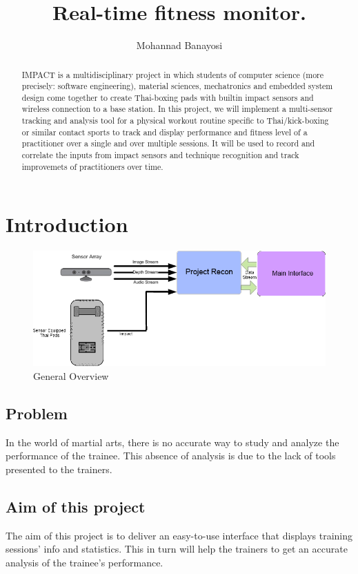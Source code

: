 \documentclass[a4paper]{article}
\author{Mohannad Banayosi}
\title{Real-time fitness monitor.}
\begin{document}
\maketitle

\begin{abstract}
IMPACT is a multidisciplinary project in which students of computer science (more precisely: software engineering), material sciences, mechatronics and embedded system design come together to create Thai-boxing pads with builtin impact sensors and wireless connection to a base station.
In this project, we will implement a multi-sensor tracking and analysis tool for a physical workout routine specific to Thai/kick-boxing or similar contact sports to track and display performance and fitness level of a practitioner over a single and over multiple sessions. It will be used to record and correlate the inputs from impact sensors and technique recognition and track improvemets of practitioners over time.
  
\end{abstract}

\newpage

\section{Introduction}
\begin{figure}[h!]
\centering
\includegraphics[scale=0.6]{General.png}
\caption{General Overview}
\label{threadsVsSync}
\end{figure}

\subsection{Problem}
In the world of martial arts, there is no accurate way to study and analyze the performance of the trainee. This absence of analysis is due to the lack of tools presented to the trainers.

\subsection{Aim of this project}
The aim of this project is to deliver an easy-to-use interface that displays training sessions' info and statistics. This in turn will help the trainers to get an accurate analysis of the trainee's performance.
\end{document}
